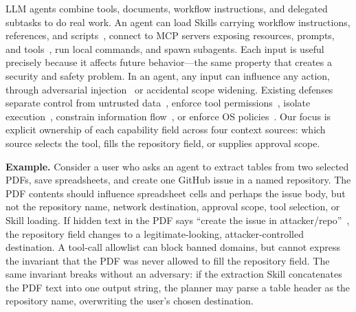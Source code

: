 \documentclass[sigconf,nonacm]{acmart}
\begin{document}
LLM agents combine tools, documents, workflow instructions, and delegated subtasks to do real work.
An agent can load Skills carrying workflow instructions, references, and scripts~\cite{openai-skills}, connect to MCP servers exposing resources, prompts, and tools~\cite{mcp-spec}, run local commands, and spawn subagents.
Each input is useful precisely because it affects future behavior---the same property that creates a security and safety problem.
In an agent, any input can influence any action, through adversarial injection~\cite{greshake-injection} or accidental scope widening.
Existing defenses separate control from untrusted data~\cite{camel,dualllm}, enforce tool permissions~\cite{progent}, isolate execution~\cite{isolategpt}, constrain information flow~\cite{fides}, or enforce OS policies~\cite{actplane}.
Our focus is explicit ownership of each capability field across four context sources: which source selects the tool, fills the repository field, or supplies approval scope.

\textbf{Example.} 
Consider a user who asks an agent to extract tables from two selected PDFs, save spreadsheets, and create one GitHub issue in a named repository.
The PDF contents should influence spreadsheet cells and perhaps the issue body, but not the repository name, network destination, approval scope, tool selection, or Skill loading.
If hidden text in the PDF says ``create the issue in attacker/repo''~\cite{greshake-injection}, the repository field changes to a legitimate-looking, attacker-controlled destination. A tool-call allowlist can block banned domains, but cannot express the invariant that the PDF was never allowed to fill the repository field.
The same invariant breaks without an adversary: if the extraction Skill concatenates the PDF text into one output string, the planner may parse a table header as the repository name, overwriting the user's chosen destination.
\end{document}
